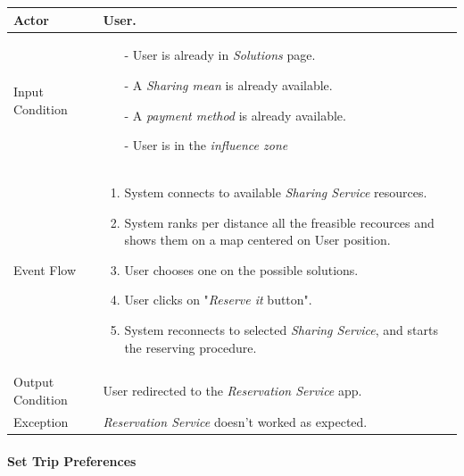 		\begin{tabular}{| l | p{} | }
			\hline
			\hline
			Actor	&		User. \\
			\hline
			Input Condition		&		\begin{itemize}
													\item[-] User is already in \textit{Solutions} page.
													\item[-] A \textit{Sharing mean} is already available.
													\item[-] A \textit{payment method} is already available.
													\item[-] User is in the \textit{influence zone}
												\end{itemize} \\
			\hline
			Event Flow		&		\begin{enumerate}
												\item System connects to available \textit{Sharing Service} resources.
												\item System ranks per distance all the freasible recources and shows them on a map centered on User position.
												\item User chooses one on the possible solutions.												
												\item User clicks on "\textit{Reserve it} button".
												\item	 System reconnects to selected \textit{Sharing Service}, and starts the reserving procedure.
											\end{enumerate} \\
			\hline
			Output Condition		&		User redirected to the \textit{Reservation Service} app. \\
			\hline		
			Exception		&		\textit{Reservation Service} doesn't worked as expected. \\
			\hline
			\hline
		\end{tabular}
		
		

	\paragraph{Set Trip Preferences}
	
